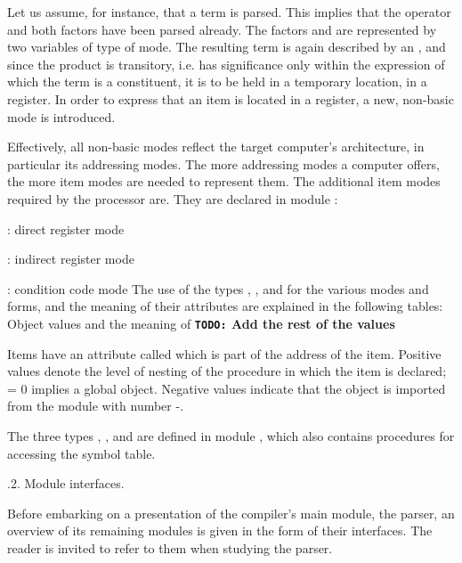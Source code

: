 Let us assume, for instance, that a term  is parsed. This implies that the operator and both factors have been parsed already. The factors  and  are represented by two variables of type  of  mode. The resulting term is again described by an , and since the product is transitory, i.e. has significance only within the expression of which the term is a constituent, it is to be held in a temporary location, in a register. In order to express that an item is located in a register, a new, non-basic mode  is introduced.

Effectively, all non-basic modes reflect the target computer's architecture, in particular its addressing modes. The more addressing modes a computer offers, the more item modes are needed to represent them. The additional item modes required by the \RISC processor are. They are declared in module :
\medskip
\item{:}  direct register mode
\item{:} indirect register mode
\item{:} condition code mode
\medskip
The use of the types , , and  for the various modes and forms, and the meaning of their attributes are explained in the following tables:
\medskip
Object values and the meaning of 
\medskip
{\bf{\tt TODO:} Add the rest of the values}

Items have an attribute called  which is part of the address of the item. Positive values denote the level of nesting of the procedure in which the item is declared;  = 0 implies a global object. Negative values indicate that the object is imported from the module with number -.

The three types , , and  are defined in module , which also contains procedures for accessing the symbol table.

.2. Module interfaces.

Before embarking on a presentation of the compiler's main module, the parser, an overview of its remaining modules is given in the form of their interfaces. The reader is invited to refer to them when studying the parser.

